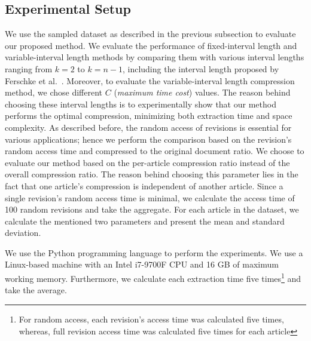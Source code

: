 \documentclass[acmsmall]{acmart}
\begin{document}
\subsection{Experimental Setup}
We use the sampled dataset as described in the previous subsection to evaluate our proposed method. We evaluate the performance of fixed-interval length and variable-interval length methods by comparing them with various interval lengths ranging from $k = 2$ to $k = n-1$, including the interval length proposed by Ferschke et al.~\cite{ferschke2011wikipedia}. Moreover, to evaluate the variable-interval length compression method, we chose different $C$ (\emph{maximum time cost}) values. The reason behind choosing these interval lengths is to experimentally show that our method performs the optimal compression, minimizing both extraction time and space complexity. As described before, the random access of revisions is essential for various applications; hence we perform the comparison based on the revision's random access time and compressed to the original document ratio. We choose to evaluate our method based on the per-article compression ratio instead of the overall compression ratio. The reason behind choosing this parameter lies in the fact that one article's compression is independent of another article. Since a single revision's random access time is minimal, we calculate the access time of 100 random revisions and take the aggregate. For each article in the dataset, we calculate the mentioned two parameters and present the mean and standard deviation.

We use the Python programming language to perform the experiments. We use a Linux-based machine with an Intel i7-9700F CPU and 16 GB of maximum working memory. Furthermore, we calculate each extraction time five times\footnote{For random access, each revision's access time was calculated five times, whereas, full revision access time was calculated five times for each article} and take the average.
         

\end{document}
